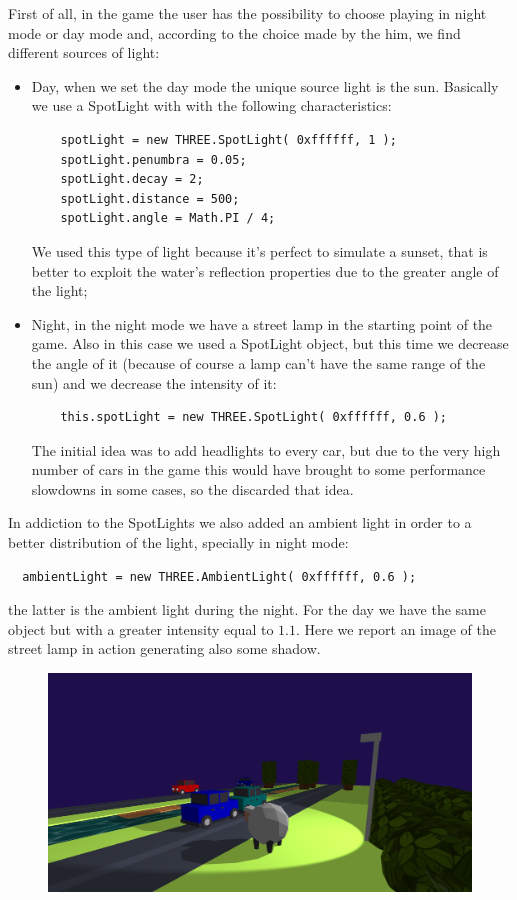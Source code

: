 \documentclass[a4paper, 11pt]{article}
\begin{document}
First of all, in the game the user has the possibility to choose playing in night mode or day mode and, according to the choice made by the him, we find different sources of light:
\begin{itemize}
  \item Day, when we set the day mode the unique source light is the sun. Basically we use a SpotLight with with the following characteristics:
  \begin{lstlisting}
    spotLight = new THREE.SpotLight( 0xffffff, 1 );
    spotLight.penumbra = 0.05;
    spotLight.decay = 2;
    spotLight.distance = 500;
    spotLight.angle = Math.PI / 4;
  \end{lstlisting}
  We used this type of light because it's perfect to simulate a sunset, that is better to exploit the water's reflection properties due to the greater angle of the light;
  \item Night, in the night mode we have a street lamp in the starting point of the game. Also in this case we used a SpotLight object, but this time we decrease the angle of it (because of course a lamp can't have the same range of the sun) and we decrease the intensity of it:
  \begin{lstlisting}
    this.spotLight = new THREE.SpotLight( 0xffffff, 0.6 );
  \end{lstlisting}
  The initial idea was to add headlights to every car, but due to the very high number of cars in the game this would have brought to some performance slowdowns in some cases, so the discarded that idea. 
\end{itemize}
In addiction to the SpotLights we also added an ambient light in order to a better distribution of the light, specially in night mode:
\begin{lstlisting}
  ambientLight = new THREE.AmbientLight( 0xffffff, 0.6 );
\end{lstlisting}
the latter is the ambient light during the night. For the day we have the same object but with a greater intensity equal to $1.1$. Here we report an image of the street lamp in action generating also some shadow.

\begin{figure}[!h]
  \includegraphics[scale=0.25]{lampShadow.png}\\
\end{figure}
\end{document}
